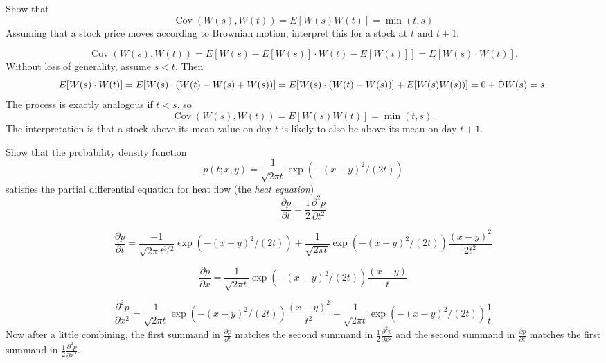 \begin{problem}
 Show that
   \[
      \operatorname{Cov}(W(s),W(t)) = E[W(s) W(t)] = \min(t,s)
   \]
  Assuming that a stock price moves according to Brownian motion,
  interpret this for a stock at $ t $ and $ t+1 $. 
\end{problem} 
\begin{solution} 

\[
   \operatorname{Cov}(W(s),W(t)) = E[W(s) - E[W(s)] \cdot W(t) -
   E[W(t)]] = E[W(s) \cdot W(t)].
\]
Without loss of generality, assume $s < t$.  Then
\[
   E[W(s) \cdot W(t)] = E[ W(s) \cdot ( W(t) - W(s) + W(s))]
   = E[ W(s) \cdot ( W(t) - W(s)) ] + E[ W(s) W(s))] = 0 +
   \mathsf{D} W(s) = s.
\]
The process is exactly analogous if $t < s$, so 
\[
   \operatorname{Cov}(W(s),W(t)) = E[W(s) W(t)] = \min(t,s).
\]
The interpretation is that a stock above its mean value on day $
t $ is likely to also be above its mean on day $ t + 1 $. 
\end{solution}

\begin{problem}
  Show that the probability density function
  \[
      p(t;x,y) = \frac{1}{\sqrt{2\pi t}} \exp( -(x-y)^2/(2t) )
  \]
  satisfies the partial differential equation for heat flow (the
  \emph{heat equation})
  \[
     \frac{\partial p}{\partial t} = \frac{1}{2} \frac{\partial^2
     p}{\partial t^2}
  \]

\end{problem} 
\begin{solution} 
\[
   \frac{\partial p}{\partial t} 
    = \frac{-1}{\sqrt{2\pi}  t^{3/2} } \exp( -(x-y)^2/(2t) ) 
    + \frac{1}{\sqrt{2\pi t}} \exp( -(x-y)^2/(2t) ) \frac{ (x-y)^2}{2 t^2}
\]

\[
   \frac{\partial p}{\partial x} 
    = \frac{1}{\sqrt{2\pi t}} \exp( -(x-y)^2/(2t) ) \frac{ (x-y)}{t}
\]

\[
   \frac{\partial^2 p}{\partial x^2} 
    = \frac{1}{\sqrt{2\pi t}} \exp( -(x-y)^2/(2t) ) \frac{
   (x-y)^2}{t^2}
   + \frac{1}{\sqrt{2\pi t}} \exp( -(x-y)^2/(2t) ) \frac{1}{t}  
\]
Now after a little combining, 
the first summand in  $ \frac{\partial p}{\partial t} $ matches
the second summand in $ \frac{1}{2}  \frac{\partial^2 p}{\partial x^2}$ 
and the second summand in  $ \frac{\partial p}{\partial t} $ matches
the first summand in $ \frac{1}{2}  \frac{\partial^2 p}{\partial x^2}$.
\end{solution}

